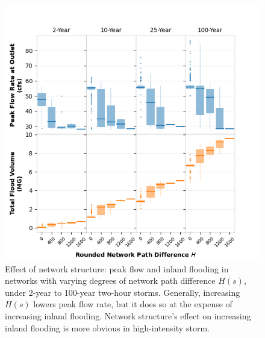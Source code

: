 \documentclass[draft]{agujournal2019}
\begin{document}
 \begin{figure}
 \noindent\includegraphics[width=\textwidth]{network_structure.png}
\caption{Effect of network structure: peak flow and inland flooding in networks with varying degrees of network path difference $H(s)$, under 2-year to 100-year two-hour storms. Generally, increasing $H(s)$ lowers peak flow rate, but it does so at the expense of increasing inland flooding. Network structure's effect on increasing inland flooding is more obvious in high-intensity storm.}
 \label{fig:network_structure}
\end{figure}
\end{document}
